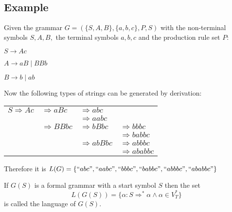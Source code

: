 \subsection{Example}
Given the grammar $G = (\{S,A,B\},\{a,b,c\},P,S)$ with the non-terminal symbols $S,A,B,$ the terminal symbols $a,b,c$ and the production rule set $P$:

$S \rightarrow Ac$

$A \rightarrow aB \mid BBb$

$B \rightarrow b \mid ab$

Now the following types of strings can be generated by derivation:

\begin{tabular}{llll}
$S \Rightarrow Ac$ & $\Rightarrow aBc$ & $\Rightarrow abc$ & \\
 & & $\Rightarrow aabc$ & \\
 & $\Rightarrow BBbc$ & $\Rightarrow bBbc$ & $\Rightarrow bbbc$ \\
 & & & $\Rightarrow babbc$ \\
 & & $\Rightarrow abBbc$ & $\Rightarrow abbbc$ \\
 & & & $\Rightarrow ababbc$ \\
\end{tabular}

Therefore it is $L(G) = \{``abc", ``aabc", ``bbbc", ``babbc", ``abbbc", ``ababbc"\}$

If $G(S)$ is a formal grammar with a start symbol $S$ then the set $$L(G(S)) = \{\alpha : S \Rightarrow^* \alpha \wedge \alpha \in V^{*}_{T}\}$$
is called the language of $G(S)$.

